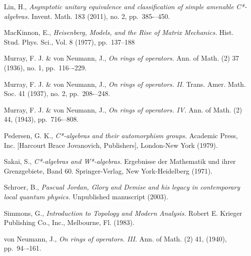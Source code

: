 \documentclass[12pt,a4paper]{amsart}
\theoremstyle{plain}
\theoremstyle{definition}
\begin{document}
\begin{thebibliography}{00}
	Lin, H.,
	\emph{Asymptotic unitary equivalence and classification of simple amenable C*-algebras.}
	Invent. Math. 183 (2011), no. 2, pp.~385-–450. 

	MacKinnon, E.,
	\emph{Heisenberg, Models, and the Rise of Matrix Mechanics.}
	Hist. Stud. Phys. Sci., Vol. 8 (1977), pp.~137--188
	
	Murray, F. J. \& von Neumann, J.,
	\emph{On rings of operators.}
	Ann. of Math. (2) 37 (1936), no. 1, pp.~116–-229.

	Murray, F. J. \& von Neumann, J.,
	\emph{On rings of operators. II.}
	Trans. Amer. Math. Soc. 41 (1937), no. 2, pp.~208-–248. 

	Murray, F. J. \& von Neumann, J.,
	\emph{On rings of operators. IV.}
	Ann. of Math. (2) 44, (1943), pp.~716-–808.
	
	Pedersen, G. K.,
	\emph{C*-algebras and their automorphism groups.}
	Academic Press, Inc. [Harcourt Brace Jovanovich, Publishers], London-New York (1979).

	Sakai, S.,
	\emph{C*-algebras and W*-algebras.}
	Ergebnisse der Mathematik und ihrer Grenzgebiete, Band 60. Springer-Verlag, New York-Heidelberg (1971).

	Schroer, B.,
	\emph{Pascual Jordan, Glory and Demise and his legacy in contemporary local quantum physics.}
	Unpublished manuscript (2003).
	
	Simmons, G.,
	\emph{Introduction to Topology and Modern Analysis.}
	Robert E. Krieger Publishing Co., Inc., Melbourne, Fl. (1983).

	von Neumann, J.,
	\emph{On rings of operators. III.}
	Ann. of Math. (2) 41, (1940), pp.~94–-161.

	
\end{thebibliography}
\end{document}
